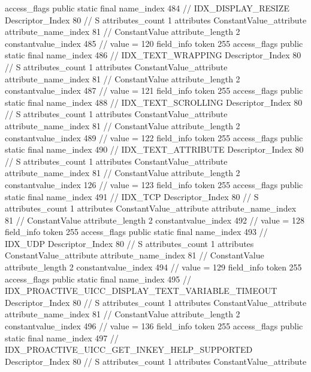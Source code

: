 {{{{{				access_flags	public static final
				name_index	484		// IDX_DISPLAY_RESIZE
				Descriptor_Index	80		// S
				attributes_count	1
				attributes {
				ConstantValue_attribute {
					attribute_name_index	81		// ConstantValue
					attribute_length	2
					constantvalue_index	485		// value = 120
				}
				}
			}
			field_info {
				token	255
				access_flags	public static final
				name_index	486		// IDX_TEXT_WRAPPING
				Descriptor_Index	80		// S
				attributes_count	1
				attributes {
				ConstantValue_attribute {
					attribute_name_index	81		// ConstantValue
					attribute_length	2
					constantvalue_index	487		// value = 121
				}
				}
			}
			field_info {
				token	255
				access_flags	public static final
				name_index	488		// IDX_TEXT_SCROLLING
				Descriptor_Index	80		// S
				attributes_count	1
				attributes {
				ConstantValue_attribute {
					attribute_name_index	81		// ConstantValue
					attribute_length	2
					constantvalue_index	489		// value = 122
				}
				}
			}
			field_info {
				token	255
				access_flags	public static final
				name_index	490		// IDX_TEXT_ATTRIBUTE
				Descriptor_Index	80		// S
				attributes_count	1
				attributes {
				ConstantValue_attribute {
					attribute_name_index	81		// ConstantValue
					attribute_length	2
					constantvalue_index	126		// value = 123
				}
				}
			}
			field_info {
				token	255
				access_flags	public static final
				name_index	491		// IDX_TCP
				Descriptor_Index	80		// S
				attributes_count	1
				attributes {
				ConstantValue_attribute {
					attribute_name_index	81		// ConstantValue
					attribute_length	2
					constantvalue_index	492		// value = 128
				}
				}
			}
			field_info {
				token	255
				access_flags	public static final
				name_index	493		// IDX_UDP
				Descriptor_Index	80		// S
				attributes_count	1
				attributes {
				ConstantValue_attribute {
					attribute_name_index	81		// ConstantValue
					attribute_length	2
					constantvalue_index	494		// value = 129
				}
				}
			}
			field_info {
				token	255
				access_flags	public static final
				name_index	495		// IDX_PROACTIVE_UICC_DISPLAY_TEXT_VARIABLE_TIMEOUT
				Descriptor_Index	80		// S
				attributes_count	1
				attributes {
				ConstantValue_attribute {
					attribute_name_index	81		// ConstantValue
					attribute_length	2
					constantvalue_index	496		// value = 136
				}
				}
			}
			field_info {
				token	255
				access_flags	public static final
				name_index	497		// IDX_PROACTIVE_UICC_GET_INKEY_HELP_SUPPORTED
				Descriptor_Index	80		// S
				attributes_count	1
				attributes {
				ConstantValue_attribute {
}}}}}}}
